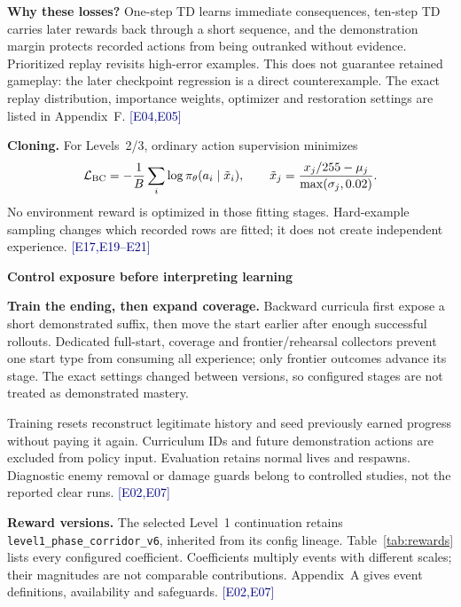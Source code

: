 \documentclass[11pt,a4paper]{article}
\newcommand{\topic}[2]{\vspace*{-4mm}{\small\color{teal}\textbf{#1}}\par{\LARGE\bfseries #2}\par\vspace{3mm}}
\newcommand{\ev}[1]{{\small\textcolor{navy}{[#1]}}}
\begin{document}
\textbf{Why these losses?} One-step TD learns immediate consequences, ten-step TD carries later rewards back through a short sequence, and the demonstration margin protects recorded actions from being outranked without evidence. Prioritized replay revisits high-error examples. This does not guarantee retained gameplay: the later checkpoint regression is a direct counterexample. The exact replay distribution, importance weights, optimizer and restoration settings are listed in Appendix~F. \ev{E04,E05}

\textbf{Cloning.} For Levels~2/3, ordinary action supervision minimizes
\begin{equation}\label{eq:bc}
 \mathcal L_{\rm BC}=-\frac1B\sum_i\log \pi_\theta(a_i\mid\tilde x_i),\qquad
 \tilde x_j=\frac{x_j/255-\mu_j}{\max(\sigma_j,0.02)}.
\end{equation}
No environment reward is optimized in those fitting stages. Hard-example sampling changes which recorded rows are fitted; it does not create independent experience. \ev{E17,E19--E21}

\newpage
\topic{05 / CURRICULA AND REWARDS}{Control exposure before interpreting learning}
\textbf{Train the ending, then expand coverage.} Backward curricula first expose a short demonstrated suffix, then move the start earlier after enough successful rollouts. Dedicated full-start, coverage and frontier/rehearsal collectors prevent one start type from consuming all experience; only frontier outcomes advance its stage. The exact settings changed between versions, so configured stages are not treated as demonstrated mastery.

Training resets reconstruct legitimate history and seed previously earned progress without paying it again. Curriculum IDs and future demonstration actions are excluded from policy input. Evaluation retains normal lives and respawns. Diagnostic enemy removal or damage guards belong to controlled studies, not the reported clear runs. \ev{E02,E07}

\textbf{Reward versions.} The selected Level~1 continuation retains \texttt{level1\_phase\_corridor\_v6}, inherited from its config lineage. Table~\ref{tab:rewards} lists every configured coefficient. Coefficients multiply events with different scales; their magnitudes are not comparable contributions. Appendix~A gives event definitions, availability and safeguards. \ev{E02,E07}
\end{document}

